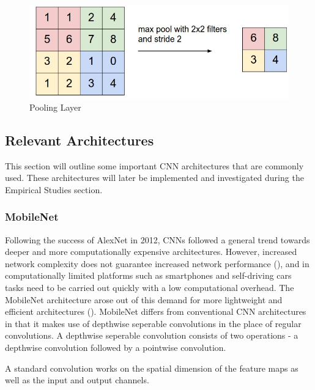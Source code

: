 \documentclass[12pt]{report}
\begin{document}
\vspace{0.5cm}
\begin{figure}[ht!]
	\centering
	\includegraphics[width=12cm]{pool}
	\caption{Pooling Layer}
	\label{fig:pool}
\end{figure}

\newpage
\subsection{Relevant Architectures}
\begin{flushleft}
This section will outline some important CNN architectures that are commonly used. These architectures will later be implemented and investigated during the Empirical Studies section.
\end{flushleft}

\subsubsection{MobileNet}
\begin{flushleft}
Following the success of AlexNet in 2012, CNNs followed a general trend towards deeper and more computationally expensive architectures. However, increased network complexity does not guarantee increased network performance (\cite{szegedy2016rethinking}), and in computationally limited platforms such as smartphones and self-driving cars tasks need to be carried out quickly with a low computational overhead. The MobileNet architecture arose out of this demand for more lightweight and efficient architectures (\cite{howard2017mobilenets}). MobileNet differs from conventional CNN architectures in that it makes use of depthwise seperable convolutions in the place of regular convolutions. A depthwise seperable convolution consists of two operations - a depthwise convolution followed by a pointwise convolution.

A standard convolution works on the spatial dimension of the feature maps as well as the input and output channels.
\end{flushleft}
\end{document}

